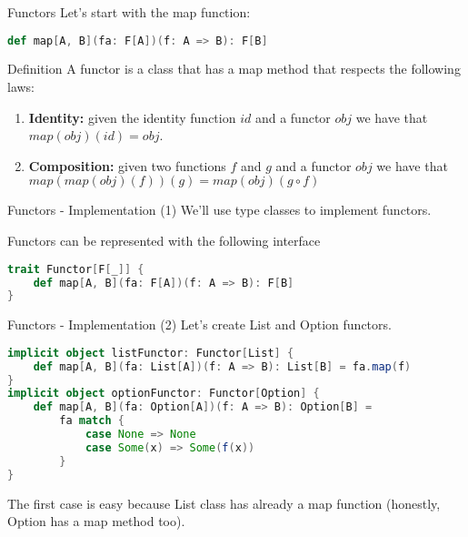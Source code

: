 \begin{frame}[fragile]{Functors}
	Let's start with the map function:
\begin{lstlisting}[language=scala]
def map[A, B](fa: F[A])(f: A => B): F[B]
\end{lstlisting}
	\pause
	\begin{block}{Definition}
		A functor is a class that has a map method that respects the following laws:
		\begin{enumerate}[<+->]
			\item \textbf{Identity:} given the identity function $id$ and a functor $obj$ we have that $map(obj)(id) = obj$.
			\item \textbf{Composition:} given two functions $f$ and $g$ and a functor $obj$ we have that $map(map(obj)(f))(g) = map(obj)(g \circ f)$
		\end{enumerate}
	\end{block}	
\end{frame}

\begin{frame}[fragile]{Functors - Implementation (1)}	
	We'll use type classes to implement functors.
	
	Functors can be represented with the following interface
\begin{lstlisting}[language=scala]
trait Functor[F[_]] {
	def map[A, B](fa: F[A])(f: A => B): F[B]
}
\end{lstlisting}
\end{frame}

\begin{frame}[fragile]{Functors - Implementation (2)}			
	Let's create List and Option functors.
\begin{lstlisting}[language=scala]
implicit object listFunctor: Functor[List] {
	def map[A, B](fa: List[A])(f: A => B): List[B] = fa.map(f)
}
implicit object optionFunctor: Functor[Option] {
	def map[A, B](fa: Option[A])(f: A => B): Option[B] = 
		fa match {
			case None => None
			case Some(x) => Some(f(x))	
		}
}			
\end{lstlisting}		
	The first case is easy because List class has already a map function
	(honestly, Option has a map method too).
\end{frame}
	
